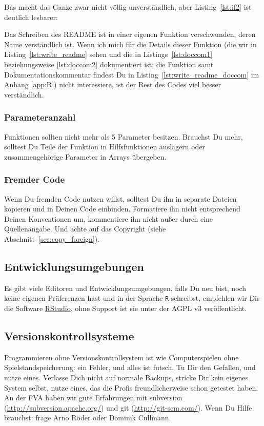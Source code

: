 \documentclass[twoside]{scrartcl}
\providecommand{\R}{\texttt{R}}
\begin{document}


Das macht das Ganze zwar nicht v\"o{}llig unverst\"a{}ndlich, aber
Listing~\ref{lst:if2} ist deutlich lesbarer:



Das Schreiben des README ist in
einer eigenen Funktion verschwunden, deren Name verst\"a{}ndlich ist. Wenn ich
mich f\"u{}r die Details dieser Funktion 
(die wir in Listing~\ref{lst:write_readme} sehen und die in
Listings~\ref{lst:doccom1} beziehungsweise \ref{lst:doccom2} dokumentiert ist;
die Funktion samt Dokumentationskommentar findest Du in 
Listing~\ref{lst:write_readme_doccom} 
im Anhang \ref{app:R})
nicht interessiere, ist der Rest des Codes viel besser verst\"a{}ndlich.



\subsubsection{Parameteranzahl\label{sec:parameteranzahl}} 
Funktionen sollten nicht mehr als 5 Parameter besitzen.
Brauchst Du mehr, solltest Du Teile der Funktion in Hilfsfunktionen auslagern
oder zusammengeh\"o{}rige Parameter in Arrays \"u{}bergeben.

\subsubsection{Fremder Code} 
Wenn Du fremden Code nutzen willst, solltest Du ihn in separate Dateien kopieren
und in Deinen Code einbinden. 
Formatiere ihn nicht entsprechend Deinen Konventionen um, 
kommentiere ihn nicht au\ss{}er durch eine Quellenangabe. 
Und achte auf das Copyright (siehe Abschnitt~\ref{sec:copy_foreign}).

\subsection{Entwicklungsumgebungen}
Es gibt viele Editoren und Entwicklungsumgebungen, falls Du neu bist, noch keine
eigenen Pr\"a{}ferenzen hast und in der Sprache \R{} schreibst, empfehlen wir 
Dir die Software \href{http://www.rstudio.com/products/rstudio/}{RStudio}, 
ohne Support ist sie unter der AGPL v3 ver\"o{}ffentlicht.

\subsection{Versionskontrollsysteme\label{sec:vcs}}
Programmieren ohne Versionskontrollsystem ist wie Computerspielen ohne 
Spielstandspeicherung: ein Fehler, und alles ist futsch.
Tu Dir den Gefallen, und nutze eines.
Verlasse Dich nicht auf normale Backups, stricke Dir kein eigenes System selbst,
nutze eines, das die Profis freundlicherweise schon getestet haben. 
An der FVA haben wir gute Erfahrungen mit 
subversion (\url{http://subversion.apache.org/})
und git (\url{http://git-scm.com/}).
Wenn Du Hilfe brauchst: frage Arno R\"o{}der oder Dominik Cullmann.  
\end{document}
